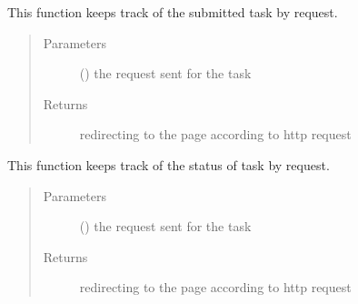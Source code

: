 \documentclass[letterpaper,10pt,english]{sphinxmanual}
\begin{document}
\begin{fulllineitems}
\label{\detokenize{janta:janta.views.submitted_tasks}}
This function keeps track of the submitted task by request.
\begin{quote}\begin{description}
\item[{Parameters}] \leavevmode
{} () \textendash{} the request sent for the task

\item[{Returns}] \leavevmode
redirecting to the page according to http request

\end{description}\end{quote}

\end{fulllineitems}


\begin{fulllineitems}
\label{\detokenize{janta:janta.views.task_status}}
This function keeps track of the status of task by request.
\begin{quote}\begin{description}
\item[{Parameters}] \leavevmode
{} () \textendash{} the request sent for the task

\item[{Returns}] \leavevmode
redirecting to the page according to http request

\end{description}\end{quote}

\end{fulllineitems}

\end{document}
